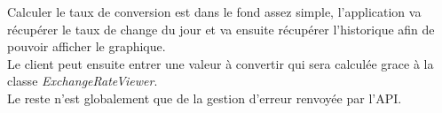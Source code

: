 Calculer le taux de conversion est dans le fond assez simple, l'application va récupérer le taux de change du jour
et va ensuite récupérer l'historique afin de pouvoir afficher le graphique.\\
Le client peut ensuite entrer une valeur à convertir qui sera calculée grace à la classe \emph{ExchangeRateViewer}.\\
Le reste n'est globalement que de la gestion d'erreur renvoyée par l'API.